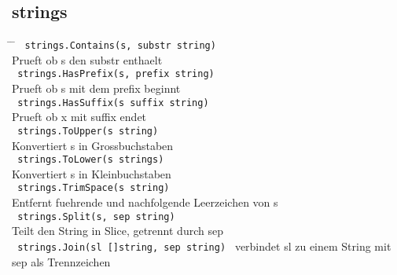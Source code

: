 \documentclass[twoside,a4paper,12pt]{article}
\begin{document}
\subsection{strings}
\begin{tabbing}
 \hspace{2mm} \= \hspace{70mm} \= \kill
 \> \verb| strings.Contains(s, substr string) | \\ 
 \> Prueft ob s den substr enthaelt \\ 
 \> \verb| strings.HasPrefix(s, prefix string) | \\ 
 \> Prueft ob s mit dem prefix beginnt \\
 \> \verb| strings.HasSuffix(s suffix string) | \\ 
 \> Prueft ob x mit suffix endet \\ 
 \> \verb| strings.ToUpper(s string) | \\ 
 \> Konvertiert s in Grossbuchstaben \\ 
 \> \verb| strings.ToLower(s strings) | \\ 
 \> Konvertiert s in Kleinbuchstaben \\ 
 \> \verb| strings.TrimSpace(s string) | \\ 
 \> Entfernt fuehrende und nachfolgende Leerzeichen von s \\ 
 \> \verb| strings.Split(s, sep string) | \\ 
 \> Teilt den String in Slice, getrennt durch sep \\ 
 \> \verb| strings.Join(sl []string, sep string) | 
 \> verbindet sl zu einem String mit sep als Trennzeichen \\ 
\end{tabbing}

\newpage 
\end{document}
